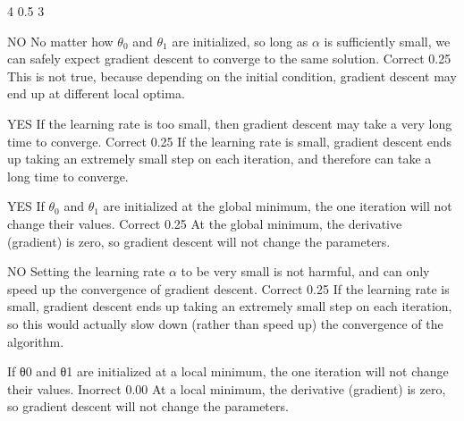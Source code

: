 4
0.5
3

NO No matter how $\theta_0$ and $\theta_1$ are initialized, so long as $\alpha$ is sufficiently small, we 
can safely expect gradient descent to converge to the same solution.	
Correct	0.25	
This is not true, because depending on the initial condition, gradient descent may end up at different local optima.

YES If the learning rate is too small, then gradient descent may take a very long time to converge.	
    Correct	0.25	
    If the learning rate is small, gradient descent ends up taking an extremely small step on each iteration, and therefore can take a long time to converge.

YES If $\theta_0$ and $\theta_1$ are initialized at the global minimum, the one iteration will not change their values.	
   Correct	0.25	
    At the global minimum, the derivative (gradient) is zero, so gradient descent will not change the parameters.

NO Setting the learning rate $\alpha$ to be very small is not harmful, and can only speed up the convergence of gradient descent.	
   Correct	0.25	
   If the learning rate is small, gradient descent ends up taking an extremely small step on each iteration, so this would actually slow down (rather than speed up) the convergence of the algorithm.

If θ0 and θ1 are initialized at a local minimum, the one iteration will not 
change their values.	Inorrect	0.00	
At a local minimum, the derivative (gradient) is zero, so gradient descent 
will not change the parameters.

